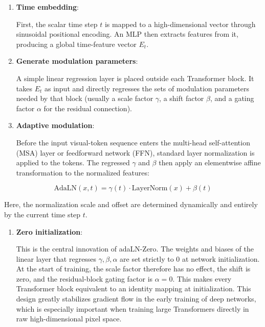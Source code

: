 \begin{enumerate}
\def\labelenumi{\arabic{enumi}.}
\item
{}
  \textbf{Time embedding}:

  First, the scalar time step \(t\) is mapped to a high-dimensional vector through sinusoidal positional encoding. An MLP then extracts features from it, producing a global time-feature vector \(E_t\).
\item
{}
  \textbf{Generate modulation parameters}:

  A simple linear regression layer is placed outside each Transformer block. It takes \(E_t\) as input and directly regresses the sets of modulation parameters needed by that block (usually a scale factor \(\gamma\), a shift factor \(\beta\), and a gating factor \(\alpha\) for the residual connection).
\item
{}
  \textbf{Adaptive modulation}:

  Before the input visual-token sequence enters the multi-head self-attention (MSA) layer or feedforward network (FFN), standard layer normalization is applied to the tokens. The regressed \(\gamma\) and \(\beta\) then apply an elementwise affine transformation to the normalized features:
\end{enumerate}

\[
\mathrm{AdaLN}(x,t)=\gamma(t)\cdot\mathrm{LayerNorm}(x)+\beta(t)
\]

Here, the normalization scale and offset are determined dynamically and entirely by the current time step \(t\).

\begin{enumerate}
\def\labelenumi{\arabic{enumi}.}
\setcounter{enumi}{3}
\item
{}
  \textbf{Zero initialization}:

  This is the central innovation of adaLN-Zero. The weights and biases of the linear layer that regresses \(\gamma,\beta,\alpha\) are set strictly to \(0\) at network initialization. At the start of training, the scale factor therefore has no effect, the shift is zero, and the residual-block gating factor is \(\alpha=0\). This makes every Transformer block equivalent to an identity mapping at initialization. This design greatly stabilizes gradient flow in the early training of deep networks, which is especially important when training large Transformers directly in raw high-dimensional pixel space.
\end{enumerate}

